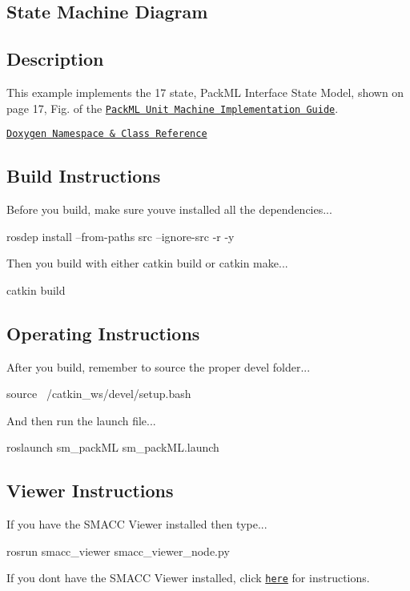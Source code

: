 \subsection*{State Machine Diagram}



\subsection*{Description}

This example implements the 17 state, Pack\+ML Interface State Model, shown on page 17, Fig. of the \href{http://omac.org/wp-content/uploads/2016/11/PackML_Unit_Machine_Implementation_Guide-V1-00.pdf}{\tt Pack\+ML Unit Machine Implementation Guide}.~\newline


\href{https://reelrbtx.github.io/SMACC_Documentation/master/html/namespacesm__packML.html}{\tt Doxygen Namespace \& Class Reference}

\subsection*{Build Instructions}

Before you build, make sure you\textquotesingle{}ve installed all the dependencies...


\begin{DoxyCode}
rosdep install --from-paths src --ignore-src -r -y 
\end{DoxyCode}


Then you build with either catkin build or catkin make...


\begin{DoxyCode}
catkin build
\end{DoxyCode}


\subsection*{Operating Instructions}

After you build, remember to source the proper devel folder...


\begin{DoxyCode}
source ~/catkin\_ws/devel/setup.bash
\end{DoxyCode}


And then run the launch file...


\begin{DoxyCode}
roslaunch sm\_packML sm\_packML.launch
\end{DoxyCode}


\subsection*{Viewer Instructions}

If you have the S\+M\+A\+CC Viewer installed then type...


\begin{DoxyCode}
rosrun smacc\_viewer smacc\_viewer\_node.py
\end{DoxyCode}


If you don\textquotesingle{}t have the S\+M\+A\+CC Viewer installed, click \href{http://smacc.ninja/smacc-viewer/}{\tt here} for instructions. 